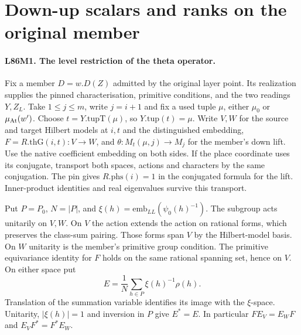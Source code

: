 \section{Down-up scalars and ranks on the original member}

\paragraph{L86M1. The level restriction of the theta operator.}
Fix a member $D=w.D(Z)$ admitted by the original layer point. Its
realization supplies the pinned characterisation, primitive conditions,
and the two readings $Y,Z_L$. Take $1\le j\le m$, write $j=i+1$ and
fix a used tuple $\mu$, either $\mu_0$ or $\mu_{\rm At}(w')$.
Choose $t=Y.\mathrm{tupT}(\mu)$, so $Y.\mathrm{tup}(t)=\mu$.
Write $V,W$ for the source and target Hilbert models at $i,t$ and
the distinguished embedding, $F=R.\mathrm{thG}(i,t):V\to W$, and
$\theta:M_t(\mu,j)\to M_j$ for the member's down lift.
Use the native coefficient embedding on both sides. If the place
coordinate uses its conjugate, transport both spaces, actions and
characters by the same conjugation. The pin gives $R.\mathrm{phs}(i)=1$ in the conjugated formula for the lift.
Inner-product identities and real eigenvalues survive this transport.

Put $P=P_0$, $N=|P|$, and $\xi(h)=\mathrm{emb}_{LL}(\psi_0(h)^{-1})$.
The subgroup acts unitarily on $V,W$. On $V$ the action extends the
action on rational forms, which preserves the class-sum pairing.
Those forms span $V$ by the Hilbert-model basis. On $W$ unitarity is
the member's primitive group condition. The primitive equivariance
identity for $F$ holds on the same rational spanning set, hence on
$V$. On either space put
\[
       E=\frac{1}{N}\sum_{h\in P}\xi(h)^{-1}\rho(h).
\]
Translation of the summation variable identifies its image with the
$\xi$-space. Unitarity, $|\xi(h)|=1$ and inversion in $P$ give
$E^*=E$. In particular $FE_V=E_WF$ and $E_VF^*=F^*E_W$.

